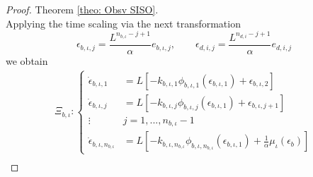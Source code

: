 \documentclass[11pt,letterpaper,twoside,openright]{report}
\begin{document}
\begin{proof}{Theorem \ref{theo: Obsv SISO}. \\}
Applying the time scaling via the next transformation	
\begin{equation}
	\epsilon_{b,\iota,j}=\frac{L^{n_{b,\iota}-j+1}}{\alpha}e_{b,\iota,j},\qquad \epsilon_{d,i,j}=\frac{L^{n_{d,i}-j+1}}{\alpha}e_{d,i,j}
\end{equation}
	we obtain 
\begin{equation}
	\begin{split}\label{ecu: CH4 Error1b}
		\Xi_{b,\iota}: \left\{
		\begin{array}{rl}
			\dot{\epsilon}_{b,\iota,1} &= L\left[ -k_{b,\iota,1}\phi_{b,\iota,1}( \epsilon_{b,\iota,1} ) + \epsilon_{b,\iota,2} \right] \\
			\dot{\epsilon}_{b,\iota,j} &= L\left[ -k_{b,\iota,j} \phi_{b,\iota,j}( \epsilon_{b,\iota,1} ) + \epsilon_{b,\iota,j+1} \right] \\
			\vdots \quad & j=1,...,n_{b,\iota}-1\\
			\dot{\epsilon}_{b,\iota,n_{b,\iota}} &= L\left[ -k_{b,\iota,n_{b,\iota}} \phi_{b,\iota,n_{b,\iota}}( \epsilon_{b,\iota,1} ) + \frac{1}{\alpha}\mu_{\iota}(\epsilon_b) \right]
		\end{array}
		\right. \\
	\end{split}
\end{equation}


\end{proof}
\end{document}
